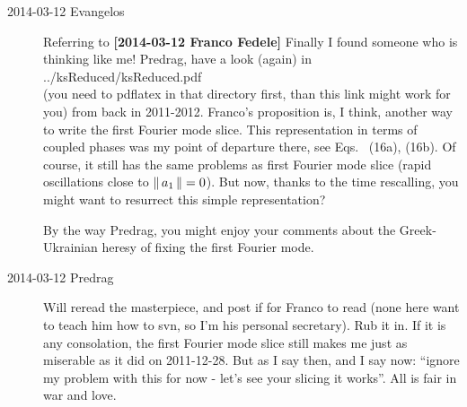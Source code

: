 \begin{description}
\item[2014-03-12 Evangelos] Referring to {\bf [2014-03-12 Franco Fedele]}
Finally I found someone who is thinking like me! Predrag,
have a look (again) in
\\
 {../ksReduced/ksReduced.pdf}
\\
(you need to pdflatex in that directory first, than this link might work for you)
from back in 2011-2012.
Franco's proposition is, I think, another way to write the first Fourier mode
slice. This representation in terms of coupled phases was
my point of departure there, see Eqs.~ (16a), (16b).
Of course, it still has the same problems as first Fourier mode slice (rapid oscillations
close to $\left\Arrowvert \, a_1 \, \right\Arrowvert=0$). But now, thanks to the time rescalling,
you might want to resurrect this simple representation?

By the way Predrag, you might enjoy your comments about the Greek-Ukrainian heresy of
fixing the first Fourier mode.

\item[2014-03-12 Predrag]
Will reread the masterpiece, and post if for Franco to read (none here
want to teach him how to svn, so I'm his personal secretary). Rub it in.
If it is any consolation, the first Fourier mode slice still makes me just
as miserable as it did on 2011-12-28.
But as I say then, and I say now: ``ignore
    my problem with this for now - let's see your slicing it works''. All is
fair in war and love.


\end{description}
